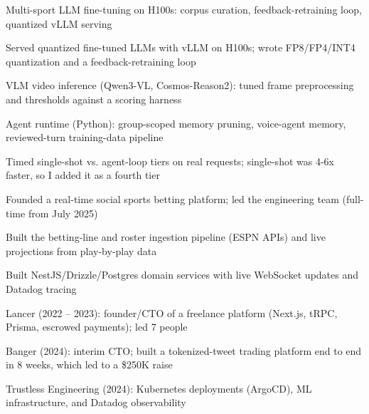 \documentclass[print]{jack-resume}
\begin{document}
\begin{tightemize}
    \item Multi-sport LLM fine-tuning on H100s: corpus curation, feedback-retraining loop, quantized vLLM serving
    \item Served quantized fine-tuned LLMs with vLLM on H100s; wrote FP8/FP4/INT4 quantization and a feedback-retraining loop
    \item VLM video inference (Qwen3-VL, Cosmos-Reason2): tuned frame preprocessing and thresholds against a scoring harness
    \item Agent runtime (Python): group-scoped memory pruning, voice-agent memory, reviewed-turn training-data pipeline
    \item Timed single-shot vs. agent-loop tiers on real requests; single-shot was 4-6x faster, so I added it as a fourth tier
\end{tightemize}
\sectionsep

\begin{tightemize}
    \item Founded a real-time social sports betting platform; led the engineering team (full-time from July 2025)
    \item Built the betting-line and roster ingestion pipeline (ESPN APIs) and live projections from play-by-play data
    \item Built NestJS/Drizzle/Postgres domain services with live WebSocket updates and Datadog tracing
\end{tightemize}
\sectionsep

\begin{tightemize}
    \item Lancer (2022 -- 2023): founder/CTO of a freelance platform (Next.js, tRPC, Prisma, escrowed payments); led 7 people
    \item Banger (2024): interim CTO; built a tokenized-tweet trading platform end to end in 8 weeks, which led to a \$250K raise
    \item Trustless Engineering (2024): Kubernetes deployments (ArgoCD), ML infrastructure, and Datadog observability
\end{tightemize}
\sectionsep
\end{document}
